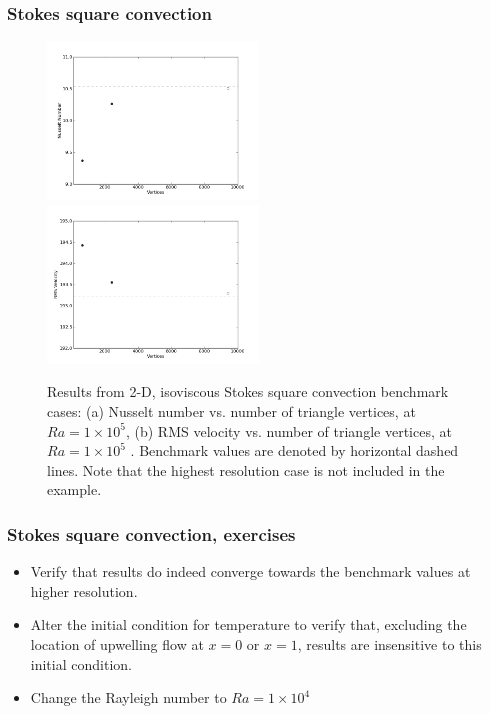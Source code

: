 \begin{frame}
    \frametitle{Stokes square convection}
\begin{figure}
\centering
\includegraphics[width=0.5\textwidth]{./stokes_square_convection/Nu_1e5.png}
\includegraphics[width=0.5\textwidth]{./stokes_square_convection/RMS_1e5.png}
\caption{Results from 2-D, isoviscous Stokes square convection benchmark cases: (a) Nusselt number
  vs. number of triangle vertices, at $Ra = 1 \times 10^5$, (b) RMS velocity vs. number of triangle
  vertices, at $Ra = 1 \times 10^5$ . Benchmark values are denoted by horizontal dashed lines. Note that the
  highest resolution case is not included in the example.}
\end{figure}
\end{frame}
%
\begin{frame}
    \frametitle{Stokes square convection, exercises}
\begin{itemize}
\item Verify that results do indeed converge towards the benchmark values at higher resolution.
\item Alter the initial condition for temperature to verify that, excluding the location of upwelling
flow at $x = 0$ or $x = 1$, results are insensitive to this initial condition.
\item Change the Rayleigh number to $Ra = 1 \times 10^4$
\end{itemize}
\end{frame}

